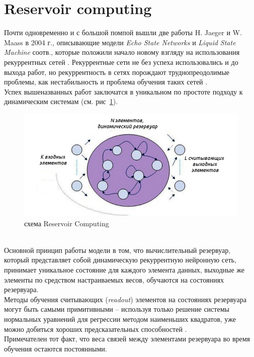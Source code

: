 \documentclass[a4paper,10pt]{article}
\begin{document}
\section{Reservoir computing}
\label{sec:res_comp_sec}
Почти одновременно и с большой помпой вышли две работы H. Jaeger \cite{esn} и W. Maass \cite{lsm} в 2004 г., описывающие модели \textit{Echo State Networks} и \textit{Liquid State Machine} соотв., которые положили начало новому взгляду на использования рекуррентных сетей . Рекуррентные сети не без успеха использовались и до выхода работ, но рекуррентность в сетях порождают труднопреодолимые проблемы, как нестабильность и проблема обучения таких сетей \cite{rnn_prob}.\\
\indent Успех вышеназванных работ заключатся в уникальном по простоте подходу к динамическим системам (см. рис~\ref{res_comp}).
\begin{figure}[ht]
\centering
\includegraphics[width=1\linewidth]{res_comp}
\caption{схема Reservoir Computing}
\label{res_comp}
\end{figure} \\
\indent Основной принцип работы модели в том, что вычислительный резервуар, который представляет собой динамическую рекуррентную нейронную сеть, принимает уникальное состояние для каждого элемента данных, выходные же элементы по средством настраиваемых весов, обучаются на состояниях резервуара.\\
\indent Методы обучения считывающих (\textit{readout}) элементов на состояниях резервуара могут быть самыми примитивными -- используя только решение системы нормальных уравнений для регрессии методом наименьших квадратов, уже можно добиться хороших предсказательных способностей \cite{esn_site}.\\
\indent Примечателен тот факт, что веса связей между элементами резервуара во время обучения остаются постоянными.
\end{document}
